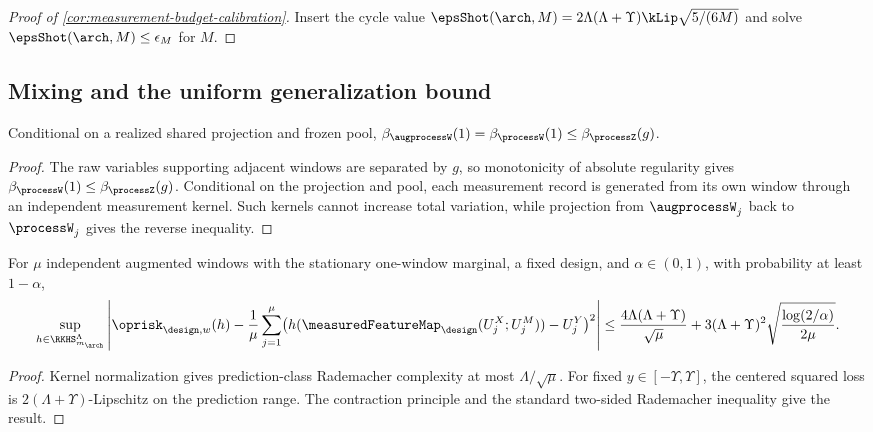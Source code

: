 \begin{proof}[Proof of \cref{cor:measurement-budget-calibration}]
Insert the cycle value
$\epsShot(\arch,M)=2\Lambda(\Lambda+\Upsilon)\kLip\sqrt{5/(6M)}$ and solve
$\epsShot(\arch,M)\leq\epsilon_M$ for $M$.
\end{proof}

\subsection{Mixing and the uniform generalization bound}

\begin{lemma}
\label{lem:augmented-window-mixing}
Conditional on a realized shared projection and frozen pool,
$\beta_{\augprocessW}(1)=\beta_{\processW}(1)\leq\beta_{\processZ}(g)$.
\end{lemma}

\begin{proof}
The raw variables supporting adjacent windows are separated by $g$, so
monotonicity of absolute regularity gives
$\beta_{\processW}(1)\leq\beta_{\processZ}(g)$.  Conditional on the projection
and pool, each measurement record is generated from its own window through an
independent measurement kernel.  Such kernels cannot increase total variation,
while projection from $\augprocessW_j$ back to $\processW_j$ gives the reverse
inequality.
\end{proof}

\begin{lemma}
\label{lem:iid-weighted-deviation}
For $\mu$ independent augmented windows with the stationary one-window
marginal, a fixed design, and $\alpha\in(0,1)$, with probability at least
$1-\alpha$,
\begin{equation}
\sup_{h\in\RKHS_{m_{\arch}}^\Lambda}
\left|
\oprisk_{\design,w}(h)
-\frac1\mu\sum_{j=1}^\mu
  \bigl(h(\measuredFeatureMap_{\design}(U_j^X;U_j^M))-U_j^Y\bigr)^2
\right|
\leq
\frac{4\Lambda(\Lambda+\Upsilon)}{\sqrt\mu}
+3(\Lambda+\Upsilon)^2
\sqrt{\frac{\log(2/\alpha)}{2\mu}}.
\label{eq:iid-measured-window-deviation}
\end{equation}
\end{lemma}

\begin{proof}
Kernel normalization gives prediction-class Rademacher complexity at most
$\Lambda/\sqrt\mu$.  For fixed $y\in[-\Upsilon,\Upsilon]$, the centered
squared loss is $2(\Lambda+\Upsilon)$-Lipschitz on the prediction range.  The
contraction principle and the standard two-sided Rademacher inequality
\citep{BartlettMendelson2002} give the result.
\end{proof}

